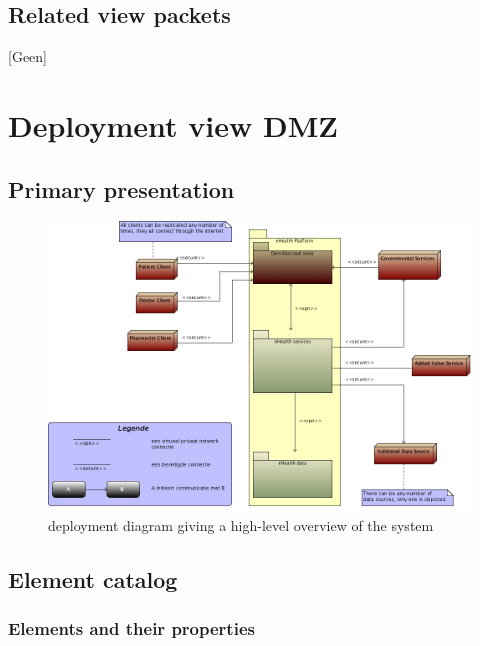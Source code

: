\documentclass[a4paper,10pt]{article}
\begin{document}
\subsection{Related view packets}
[Geen]

\clearpage
\section{Deployment view DMZ}
\label{sec:deploymentView:DMZ}

\subsection{Primary presentation}
 \begin{center}
    \begin{figure}[!h]
      \includegraphics[width=\textwidth]{../images/deployment_DMZ.jpg}
	\caption{deployment diagram giving a high-level overview of the system}
    \end{figure}
 \end{center}

\subsection{Element catalog}

\subsubsection*{Elements and their properties}
\end{document}
